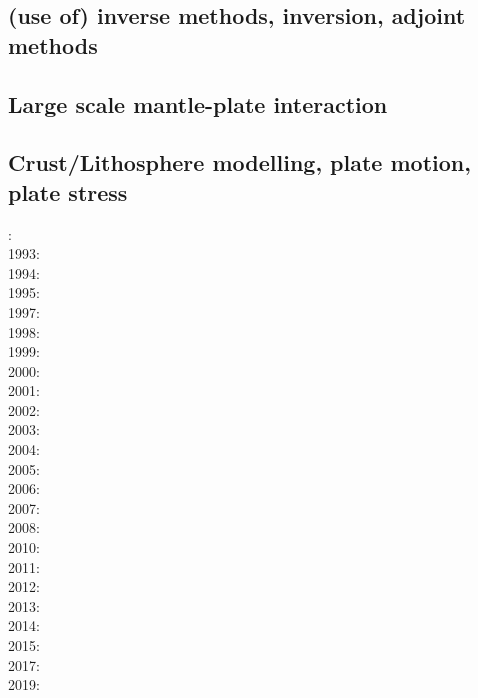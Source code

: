 \cite{rola77}
\cite{zhou08}


\subsection*{(use of) inverse methods, inversion, adjoint methods}

\cite{buht03}
\cite{wama09}
\cite{wosp14}\cite{hobo14}
\cite{wahg15}
\cite{ghbu16}
\cite{ligs17}

\subsection*{Large scale mantle-plate interaction}

\cite{algs12}

\subsection*{Crust/Lithosphere modelling, plate motion, plate stress}

: \cite{daco88}\\
1993: \cite{nefo93}\cite{brau93}\\
1994: \cite{buso94}\\
1995: \cite{belg95}\cite{brbe95}\\
1997: \cite{thsj97}\cite{babr97}\cite{bucl97}\\
1998: \cite{bird98}\cite{lecd98}\\
1999: \cite{will99b}\cite{bird99}\\
2000: \cite{hanl00}\cite{labp00}\\
2001: \cite{homo01}\cite{beoc01}\\
2002: \cite{labu02}\cite{coli02}\cite{bast02}\\
2003: \cite{wipo03}\cite{wabu03}\\
2004: \cite{tibb04}\\
2005: \cite{hagu05}\cite{wiwg05}\\
2006: \cite{libi06}\cite{bube06}\\
2007: \cite{afrf07}\\
2008: \cite{affr08}\cite{tibb08}\cite{hapo08}\cite{busc08}\\
2010: \cite{hamo10}\\
2011: \cite{rera11}\\
2012: \cite{wagw12}\cite{vacl12}\cite{buit12}\\
2013: \cite{wazh13}\\
2014: \cite{kava14}\cite{dusp14}\cite{rugb14}\cite{wavp14}\cite{whbb14}\cite{scml14}\\
2015: \cite{wavp15}\cite{thkp15}\\
2017: \cite{rugb17}\\
2019: \cite{koen19}

